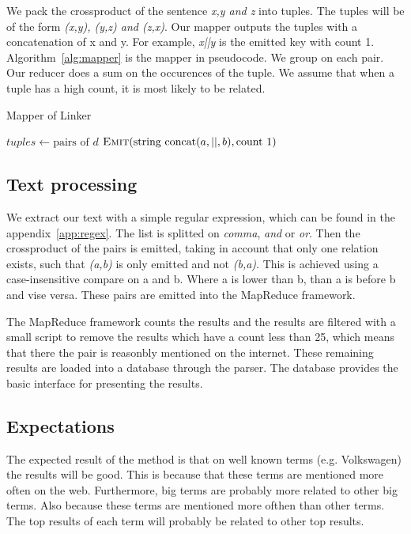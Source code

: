 \documentclass{sig-alternate}
\begin{document}
We pack the crossproduct of the sentence \emph{x,y and z} into tuples. The tuples will be of the form \emph{(x,y), (y,z) and (z,x)}. Our mapper outputs the tuples with a concatenation of x and y. For example, \emph{x||y} is the emitted key with count 1. Algorithm~\ref{alg:mapper} is the mapper in pseudocode. We group on each pair. Our reducer does a sum on the occurences of the tuple. We assume that when a tuple has a high count, it is most likely to be related. 

\begin{algorithm}[t]
\caption{Mapper of Linker}
\label{alg:mapper}
\algrenewcommand{}
\algrenewcommand{}
  \begin{algorithmic}[1]
    \State $tuples \gets \textrm{pairs of }d$
	    \State $\textsc{Emit}(\textrm{string } \textrm{concat}(a,\textrm{||},b), \textrm{count }1 )$
    \EndFor
    \EndProcedure
    \EndFunction
  \end{algorithmic}
\end{algorithm}

\subsection{Text processing}
We extract our text with a simple regular expression, which can be found in the appendix~\ref{app:regex}. The list is splitted on \emph{comma}, \emph{and} or \emph{or}. Then the crossproduct of the pairs is emitted, taking in account that only one relation exists, such that \emph{(a,b)} is only emitted and not \emph{(b,a)}. This is achieved using a case-insensitive compare on a and b. Where a is lower than b, than a is before b and vise versa. These pairs are emitted into the MapReduce framework.

The MapReduce framework counts the results and the results are filtered with a small script to remove the results which have a count less than 25, which means that there the pair is reasonbly mentioned on the internet. These remaining results are loaded into a database through the parser. The database provides the basic interface for presenting the results.

\subsection{Expectations}
The expected result of the method is that on well known terms (e.g. Volkswagen) the results will be good. This is because that these terms are mentioned more often on the web. Furthermore, big terms are probably more related to other big terms. Also because these terms are mentioned more ofthen than other terms. The top results of each term will probably be related to other top results. 
\end{document}
